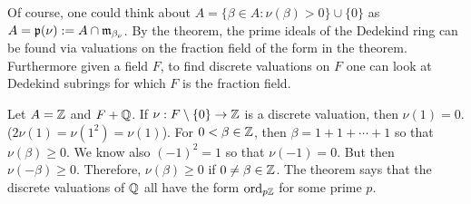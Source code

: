 Of course, one could think about $A=\{ \beta \in A \colon \nu(\beta)>0\} \cup \{0\}$ as $A=\mathfrak{p}(\nu):= A \cap \mathfrak{m}_{\beta_\nu}$. By the theorem, the prime ideals of the Dedekind ring can be found via valuations on the fraction field of the form in the theorem. Furthermore given a field $F$, to find discrete valuations on $F$ one can look at Dedekind subrings for which $F$ is the fraction field.


\begin{ex}
Let $A=\mathbb{Z}$ and $F+\mathbb{Q}$. If $\nu: F \setminus\{0\} \to \mathbb{Z}$ is a discrete valuation, then $\nu(1)=0$. ($2\nu(1)=\nu(1^2)=\nu(1)$). For $0< \beta \in \mathbb{Z}$, then $\beta=1+1+\cdots+1$ so that $\nu(\beta) \geq 0$. We know also $(-1)^2=1$ so that $\nu(-1)=0$. But then $\nu(-\beta) \geq 0$. Therefore, $\nu(\beta) \geq 0$ if $0 \neq \beta \in \mathbb{Z}$. The theorem says that the discrete valuations of $\mathbb{Q}$ all have the form $\operatorname{ord}_{p\mathbb{Z}}$ for some prime $p$.
\end{ex}

